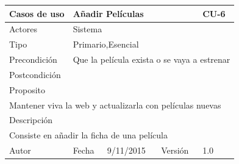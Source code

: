 \documentclass{article}
\begin{document}
\begin{table}[h]
\begin{tabular}{|l|l|l|l|l|l|}
\hline
\multicolumn{2}{|p{2cm}|}{Casos de uso}  & \multicolumn{3}{p{7cm}|}{Añadir Películas} & CU-6 \\
\hline
\multicolumn{2}{|p{2cm}|}{Actores}       & \multicolumn{4}{p{8cm}|}{Sistema}        \\
\hline
\multicolumn{2}{|p{2cm}|}{Tipo}          & \multicolumn{4}{p{8cm}|}{Primario,Esencial}        \\
\hline
\multicolumn{2}{|p{2cm}|}{Precondición}  & \multicolumn{4}{p{8cm}|}{Que la película exista o se vaya a estrenar}        \\
\hline
\multicolumn{2}{|p{2cm}|}{Postcondición} & \multicolumn{4}{p{8cm}|}{}        \\
\hline
\multicolumn{6}{|p{10cm}|}{Proposito}                                   \\
\hline
\multicolumn{6}{|p{10cm}|}{Mantener viva la web y actualizarla con películas nuevas}                                            \\
\hline
\multicolumn{6}{|p{10cm}|}{Descripción}                                 \\
\hline
\multicolumn{6}{|p{10cm}|}{Consiste en añadir la ficha de una película}                                            \\
\hline
Autor              &              & Fecha    &  9/11/2015   &   Versión  &1.0\\
\hline
\end{tabular}
\end{table}
\end{document}
